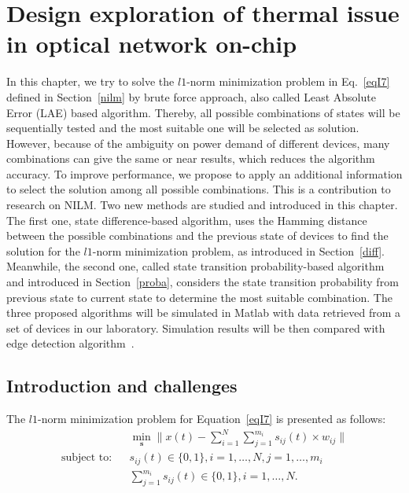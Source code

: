 
\chapter{Design exploration of thermal issue in optical network on-chip} %
\label{l6norm}

In this chapter, we try to solve the $l1$-norm minimization problem in Eq.~\eqref{eqI7} defined in Section~\ref{nilm} by brute force approach, also called Least Absolute Error (LAE) based algorithm. Thereby, all possible combinations of states will be sequentially tested and the most suitable one will be selected as solution. However, because of the ambiguity on power demand of different devices, many combinations can give the same or near results, which reduces the algorithm accuracy. To improve performance, we propose to apply an additional information to select the solution among all possible combinations. This is a contribution to research on NILM. Two new methods are studied and introduced in this chapter. The first one, state difference-based algorithm, uses the Hamming distance between the possible combinations and the previous state of devices to find the solution for the $l1$-norm minimization problem, as introduced in Section~\ref{diff}. Meanwhile, the second one, called state transition probability-based algorithm and introduced in Section~\ref{proba}, considers the state transition probability from previous state to current state to determine the most suitable combination. The three proposed algorithms will be simulated in Matlab with data retrieved from a set of devices in our laboratory. Simulation results will be then compared with edge detection algorithm~\cite{Hart92}.

\section{Introduction and challenges}\label{LAE}
The $l1$-norm minimization problem for Equation~\eqref{eqI7} is presented as follows:
\begin{eqnarray}\label{eqL1}
 &&\min_{\mathbf{s}}\parallel x(t)-\sum_{i=1}^{N}{\sum_{j=1}^{m_i}{s_{ij}(t)\times w_{ij}}}\parallel\\
\mbox{subject to:}&& s_{ij}(t)\in \{0,1\}, i=1,\ldots,N,j=1,\ldots,m_i\nonumber\\
&&\sum_{j=1}^{m_i}{s_{ij}(t)}\in \{0,1\}, i=1,\ldots,N. \nonumber
\end{eqnarray} 

